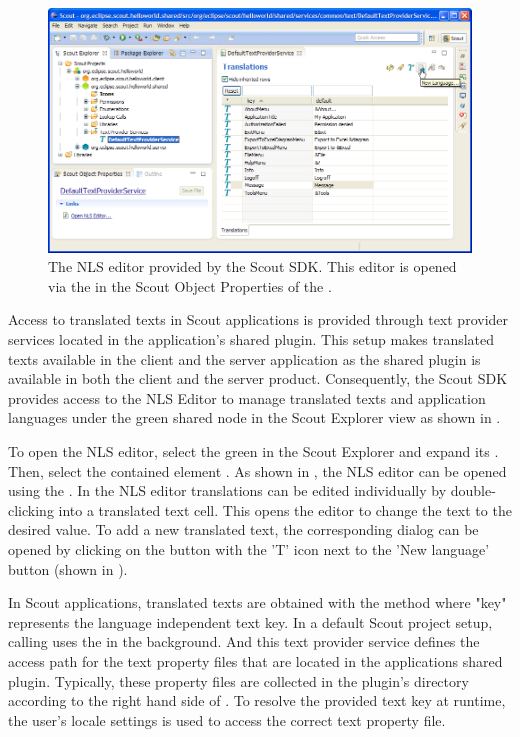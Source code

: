 \documentclass[a4paper,10pt,twoside]{book}
\begin{document}
\begin{figure}
\includegraphics[width=14cm]{sdk_nls_editor.png} 
\caption{The NLS editor provided by the Scout SDK. This editor is opened via the  in the Scout Object Properties of the .
}
\end{figure}

Access to translated texts in Scout applications is provided through text provider services located in the application's shared plugin. 
This setup makes translated texts available in the client and the server application as the shared plugin is available in both the client and the server product. 
Consequently, the Scout SDK provides access to the NLS Editor to manage translated texts and application languages under the green shared node in the Scout Explorer view as shown in .

To open the NLS editor, select the green  in the Scout Explorer and expand its .
Then, select the contained element .
As shown in , the NLS editor can be opened using the .
In the NLS editor translations can be edited individually by double-clicking into a translated text cell.
This opens the editor to change the text to the desired value.
To add a new translated text, the corresponding dialog can be opened by clicking on the button with the 'T' icon next to the 'New language' button (shown in ).

In Scout applications, translated texts are obtained with the method  where "key" represents the language independent text key.
In a default Scout project setup, calling  uses the  in the background.
And this text provider service defines the access path for the text property files that are located in the applications shared plugin.
Typically, these property files are collected in the plugin's  directory according to the right hand side of . 
To resolve the provided text key at runtime, the user's locale settings is used to access the correct text property file.
\end{document}
